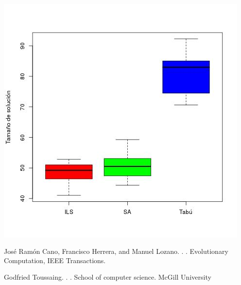\documentclass[11pt]{article}
\begin{document}
\begin{center}
  \includegraphics[scale=0.4]{sizes.jpeg}~\\[1cm]
\end{center}

%
%

\begin{thebibliography}{}

José Ramón Cano, Francisco Herrera, and Manuel Lozano.
.
.
\newblock Evolutionary Computation, IEEE Transactions.

Godfried Toussaing.
.
.
\newblock School of computer science. McGill University

\end{thebibliography}
\end{document}
